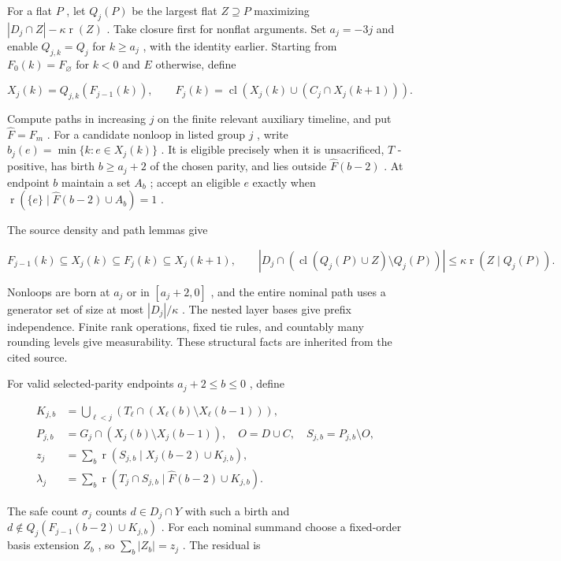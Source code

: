 \documentclass[11pt]{article}
\begin{document}
For a flat \(P\) , let \(Q_j(P)\) be the largest flat \(Z\supseteq P\) maximizing \(|D_j\cap Z|-\kappa\operatorname{r}(Z)\) . Take closure first for nonflat arguments. Set \(a_j=-3j\) and enable \(Q_{j,k}=Q_j\) for \(k\ge a_j\) , with the identity earlier. Starting from \(F_0(k)=F_{\varnothing}\) for \(k<0\) and \(E\) otherwise, define

\[X_j(k)=Q_{j,k}(F_{j-1}(k)),\qquad
 F_j(k)=\operatorname{cl}(X_j(k)\cup(C_j\cap X_j(k+1))).\]

Compute paths in increasing \(j\) on the finite relevant auxiliary timeline, and put \(\widehat F=F_m\) . For a candidate nonloop in listed group \(j\) , write \(b_j(e)=\min\{k:e\in X_j(k)\}\) . It is eligible precisely when it is unsacrificed, \(T\) -positive, has birth \(b\ge a_j+2\) of the chosen parity, and lies outside \(\widehat F(b-2)\) . At endpoint \(b\) maintain a set \(A_b\) ; accept an eligible \(e\) exactly when \(\operatorname{r}(\{e\}\mid\widehat F(b-2)\cup A_b)=1\) .

The source density and path lemmas give

\[F_{j-1}(k)\subseteq X_j(k)\subseteq F_j(k)\subseteq X_j(k+1),\qquad
 |D_j\cap(\operatorname{cl}(Q_j(P)\cup Z)\setminus Q_j(P))|\le\kappa\operatorname{r}(Z\mid Q_j(P)).\]

Nonloops are born at \(a_j\) or in \([a_j+2,0]\) , and the entire nominal path uses a generator set of size at most \(|D_j|/\kappa\) . The nested layer bases give prefix independence. Finite rank operations, fixed tie rules, and countably many rounding levels give measurability. These structural facts are inherited from the cited source.

For valid selected-parity endpoints \(a_j+2\le b\le0\) , define

\[\begin{aligned}
 K_{j,b}&=\bigcup_{\ell<j}(T_\ell\cap(X_\ell(b)\setminus X_\ell(b-1))),\\
 P_{j,b}&=G_j\cap(X_j(b)\setminus X_j(b-1)),\quad
 O=D\cup C,\quad S_{j,b}=P_{j,b}\setminus O,\\
 z_j&=\sum_b\operatorname{r}(S_{j,b}\mid X_j(b-2)\cup K_{j,b}),\\
 \lambda_j&=\sum_b\operatorname{r}(T_j\cap S_{j,b}\mid\widehat F(b-2)\cup K_{j,b}).
 \end{aligned}\]

The safe count \(\sigma_j\) counts \(d\in D_j\cap Y\) with such a birth and \(d\notin Q_j(F_{j-1}(b-2)\cup K_{j,b})\) . For each nominal summand choose a fixed-order basis extension \(Z_b\) , so \(\sum_b|Z_b|=z_j\) . The residual is
\end{document}
